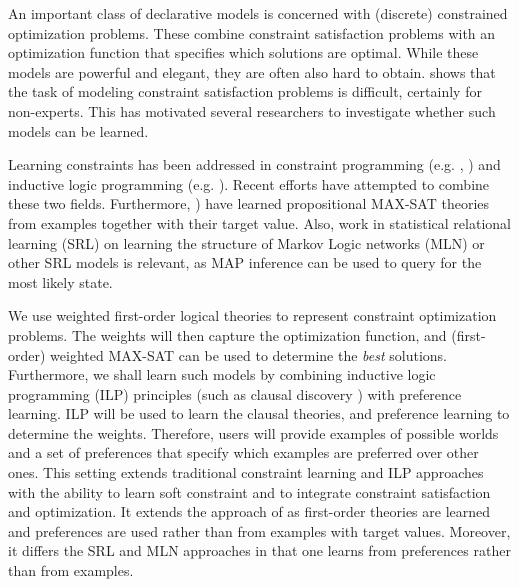 \documentclass[letterpaper]{article}
\theoremstyle{definition}
\begin{document}

An important class of declarative models is concerned with (discrete) constrained optimization problems.
These combine constraint satisfaction problems with an optimization function that specifies which solutions are optimal.
While these models are powerful and elegant, they are often also hard to obtain.
\cite{Wallace:PrinciplesCP} shows that the task of modeling constraint satisfaction problems is difficult, certainly for non-experts.
This has motivated several researchers to investigate whether such models can be learned. 

Learning constraints has been addressed in constraint programming (e.g. \cite{Beldiceanu:ModelSeeker}, \cite{bessiere2013constraint}) and inductive logic programming (e.g. \cite{DeRaedt:ClausalDiscovery}).
Recent efforts \cite{Lallouet:LearningCP} have attempted to combine these two fields.
Furthermore, \cite{campigotto2011active}) have learned propositional MAX-SAT theories from examples together with their target value.
Also, work in statistical relational learning (SRL) on learning the structure of Markov Logic networks (MLN) or other SRL models is relevant, as MAP inference can be used to query for the most likely state. 

We use weighted first-order logical theories to represent constraint optimization problems.
The weights will then capture the optimization function, and (first-order) weighted MAX-SAT can be used to determine the \emph{best} solutions.
Furthermore, we shall learn such models by combining inductive logic programming (ILP) principles (such as clausal discovery \cite{DeRaedt:ClausalDiscovery}) with preference learning.
ILP will be used to learn the clausal theories, and preference learning to determine the weights.
Therefore, users will provide examples of possible worlds and a set of preferences that specify which examples are preferred over other ones.
This setting extends traditional constraint learning and ILP approaches with the ability to learn soft constraint and to integrate constraint satisfaction and optimization.
It extends the approach of \cite{campigotto2011active} as first-order theories are learned and preferences are used rather than from examples with target values.
Moreover, it differs the SRL and MLN approaches in that one learns from preferences rather than from examples.
\end{document}
